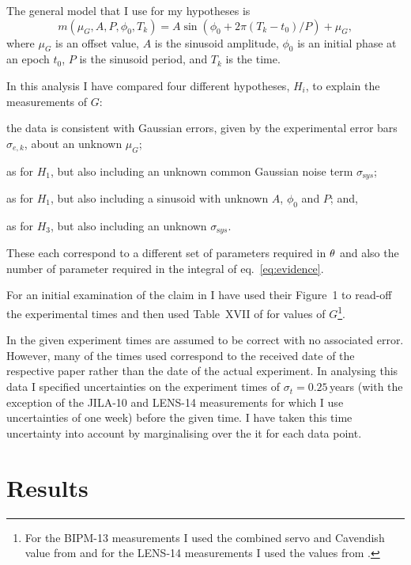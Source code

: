 \documentclass[comment]{epl2}
\begin{document}
The general model that I use for my hypotheses is
\begin{equation}\label{eq:model}
 m(\mu_G, A, P, \phi_0, T_k) = A\sin{(\phi_0 + 2\pi (T_k-t_0)/P)} + \mu_G,
\end{equation}
where $\mu_G$ is an offset value, $A$ is the sinusoid amplitude, $\phi_0$ is an initial phase at an epoch $t_0$,
$P$ is the sinusoid period, and $T_k$ is the time.

In this analysis I have compared four different hypotheses, $H_i$, to explain the measurements of $G$:
\begin{enumerate*}[label=$H_{\arabic*}$\upshape)]
 \item the data is consistent with Gaussian errors, given by the experimental error bars $\sigma_{e,k}$, about an 
 unknown $\mu_G$;
 \item as for $H_1$, but also including an unknown common Gaussian noise term $\sigma_{\mathrm sys}$;
 \item as for $H_1$, but also including a sinusoid with unknown $A$, $\phi_0$ and $P$; and, 
 \item as for $H_3$, but also including an unknown $\sigma_{\mathrm sys}$.
\end{enumerate*}
These each correspond to a different set of parameters required in $\mathbf{\theta}$ and also the number of
parameter required in the integral of eq.~\ref{eq:evidence}.

For an initial examination of the claim in \cite{2015EL....11010002A} I have used their Figure~1 to read-off
the experimental times and then used Table~XVII of \cite{RevModPhys.84.1527} for values of $G$\footnote{For
the BIPM-13 measurements I used the combined servo and Cavendish value from \cite{PhysRevLett.113.039901}
and for the LENS-14 measurements I used the values from \cite{2014Natur.510..518R}.}.

In \cite{2015EL....11010002A} the given experiment times are assumed to be correct with no associated error.
However, many of the times used correspond to the received date of the respective paper rather than the
date of the actual experiment.  In analysing this data I specified uncertainties on the experiment times of
$\sigma_{t} = 0.25$\,years (with the exception of the JILA-10 and LENS-14 measurements for which I use uncertainties
of one week) before the given time. I have taken this time uncertainty into account by marginalising over the
it for each data point.

\section{Results}
\end{document}
